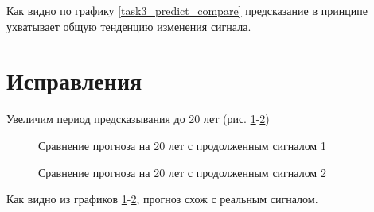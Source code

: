 \documentclass[a4paper,oneside,14pt]{extreport}
\begin{document}
Как видно по графику \ref{task3_predict_compare} предсказание в принципе ухватывает общую тенденцию изменения сигнала.

\section*{Исправления}
Увеличим период предсказывания до 20 лет (рис. \ref{task3_predict_compare2}-\ref{task3_predict_compare3})

\begin{figure}[!h]
	\caption{Сравнение прогноза на 20 лет с продолженным сигналом 1}
	\label{task3_predict_compare2}
\end{figure}

\begin{figure}[!h]
\caption{Сравнение прогноза на 20 лет с продолженным сигналом 2}
\label{task3_predict_compare3}
\end{figure}

Как видно из графиков \ref{task3_predict_compare2}-\ref{task3_predict_compare3}, прогноз схож с реальным сигналом.
\end{document}

